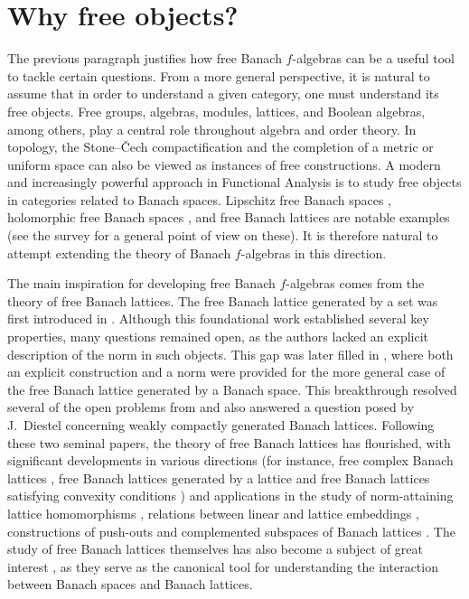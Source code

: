 \documentclass{memo-l}
\theoremstyle{definition}
\theoremstyle{remark}
\numberwithin{section}{chapter}
\numberwithin{equation}{chapter}
\newcommand{\falg}{$f\!$-algebra}
\begin{document}
\section*{Why free objects?}

The previous paragraph justifies how free Banach \falg s can be a useful tool to tackle certain questions. From a more general perspective, it is natural to assume that in order to understand a given category, one must understand its free objects.
Free groups, algebras, modules, lattices, and Boolean algebras, among others, play a
central role throughout algebra and order theory. In topology, the Stone--Čech
compactification and the completion of a metric or uniform space can
also be viewed as instances of free constructions. A modern and increasingly
powerful approach in Functional Analysis is to study free objects in
categories related to Banach spaces. Lipschitz free Banach spaces \cite{godefroy_kalton2003},
holomorphic free Banach spaces \cite{mujica1991}, and free Banach
lattices \cite{aviles_rodriguez_tradacete2018} are notable examples
(see the survey \cite{garcia-sanchez_dehevia_tradacete2024} for a
general point of view on these). It is therefore natural to attempt
extending the theory of Banach \falg s in this direction.

The main inspiration for developing free Banach \falg s comes from the
theory of free Banach lattices. The free Banach lattice generated by a
set was first introduced in \cite{de_pagter_wickstead2015}. Although this foundational work
established several key properties, many questions remained open, as
the authors lacked an explicit description of the norm in such objects.
This gap was later filled in \cite{aviles_rodriguez_tradacete2018}, where both an explicit construction and
a norm were provided for the more general case of the free Banach lattice
generated by a Banach space. This breakthrough resolved several of the
open problems from \cite{de_pagter_wickstead2015} and also answered a question posed by J.\ Diestel
concerning weakly compactly generated Banach lattices. Following these
two seminal papers, the theory of free Banach lattices has flourished,
with significant developments in various directions (for instance, free complex
Banach lattices \cite{dehevia_tradacete2023},
free Banach lattices generated by a lattice
\cite{aviles_rodriguez-abellan2019,aviles_etal2022} and free Banach lattices
satisfying convexity conditions \cite{jardon-sanchez_etal2022}) and applications in the study of
norm-attaining lattice homomorphisms \cite{bilokopytov_etal2025,dantas_etal2022}, relations between linear and
lattice embeddings \cite{aviles_etal2022_embeddings}, constructions of push-outs \cite{aviles_tradacete2023} and complemented subspaces of Banach lattices
\cite{dehevia_tradacete2025}.
The study of free Banach lattices themselves has also become
a subject of great interest
\cite{oikhberg_etal2022,aviles_tradacete_villanueva2019,garcia-sanchez_tradacete2019,aviles_plebanek_rodriguez-abellan2018,dantas_etal2021}, as they serve as the canonical tool for
understanding the interaction between Banach spaces and Banach lattices.
\end{document}

